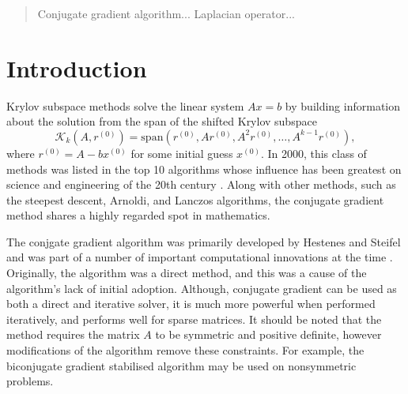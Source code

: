 
\begin{abstract}
    Conjugate gradient algorithm... Laplacian operator... 
\end{abstract}

\section{Introduction}

\iffalse
Interesting, cogent account of the work in this report
> in the context of the mathematical problem considered 
> in the scientific computing more widely
Very well referenced.

Talk about the problems we are going to discuss
> Laplacian operator. Finite difference of the finite difference of Laplace
> How do we get the matrix?
> Both for 1 and 2D.

Top 10 algorithms 20th century. How does it relate to wider mathematical community?

\fi

Krylov subspace methods solve the linear system $Ax=b$ by building information about the solution from the span of the shifted Krylov subspace 
\[
    \mathcal{K}_k(A, r^{(0)}) = \mathrm{span}\left( r^{(0)}, Ar^{(0)}, A^2r^{(0)}, \ldots, A^{k-1}r^{(0)} \right),
\]
where $r^{(0)} = A - bx^{(0)}$ for some initial guess $x^{(0)}$.
In 2000, this class of methods was listed in the top 10 algorithms whose influence has been greatest on science and engineering of the 20th century \cite{top10}. 
Along with other methods, such as the steepest descent, Arnoldi, and Lanczos algorithms, the conjugate gradient method shares a highly regarded spot in mathematics.

The conjgate gradient algorithm was primarily developed by Hestenes and Steifel and was part of a number of important computational innovations at the time \cite{cghist}.
Originally, the algorithm was a direct method, and this was a cause of the algorithm's lack of initial adoption.
Although, conjugate gradient can be used as both a direct and iterative solver, it is much more powerful when performed iteratively, and performs well for sparse matrices.
It should be noted that the method requires the matrix $A$ to be symmetric and positive definite, however modifications of the algorithm remove these constraints.
For example, the biconjugate gradient stabilised algorithm may be used on nonsymmetric problems. 

